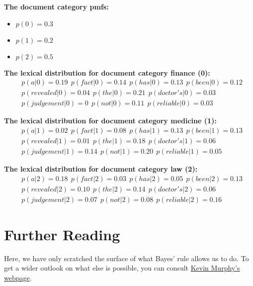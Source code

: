 \textbf{The document category pmfs:}
\begin{itemize}
\item $ p(0) = 0.3 $
\item $ p(1) = 0.2 $
\item $ p(2) = 0.5 $
\end{itemize}

\textbf{The lexical distribution for document category finance (0):}
\begin{align*}
&p(\mathit{a}|0) = 0.19~~p(\mathit{fact}|0)= 0.14~~p(\mathit{has}|0)=0.13~~p(\mathit{been}|0)=0.12 \\
&p(\mathit{revealed}|0)=0.04~~p(\mathit{the}|0)=0.21~~p(\mathit{doctor's}|0)=0.03 \\
&p(\mathit{judgement}|0)=0~~p(\mathit{not}|0)=0.11~~p(\mathit{reliable}|0)=0.03
\end{align*}

\textbf{The lexical distribution for document category medicine (1):}
\begin{align*}
&p(\mathit{a}|1) = 0.02~~p(\mathit{fact}|1)= 0.08~~p(\mathit{has}|1)=0.13~~p(\mathit{been}|1)=0.13 \\
&p(\mathit{revealed}|1)=0.01~~p(\mathit{the}|1)=0.18~~p(\mathit{doctor's}|1)=0.06 \\
&p(\mathit{judgement}|1)=0.14~~p(\mathit{not}|1)=0.20~~p(\mathit{reliable}|1)=0.05
\end{align*}

\textbf{The lexical distribution for document category law (2):}
\begin{align*}
&p(\mathit{a}|2) = 0.18~~p(\mathit{fact}|2)= 0.03~~p(\mathit{has}|2)=0.05~~p(\mathit{been}|2)=0.13 \\
&p(\mathit{revealed}|2)=0.10~~p(\mathit{the}|2)=0.14~~p(\mathit{doctor's}|2)=0.06 \\
&p(\mathit{judgement}|2)=0.07~~p(\mathit{not}|2)=0.08~~p(\mathit{reliable}|2)=0.16
\end{align*}

\section*{Further Reading}
Here, we have only scratched the surface of what Bayes' rule allows us to do. To get a wider outlook on what else is possible,
you can consult \href{http://www.cs.ubc.ca/~murphyk/Bayes/bayesrule.html}{Kevin Murphy's webpage}.


